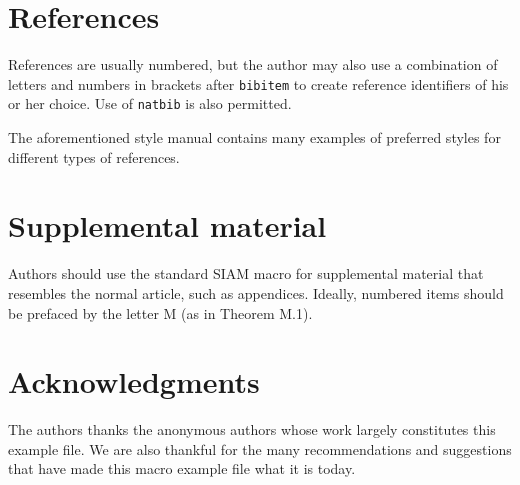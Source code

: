 \documentclass[final,leqno,onetabnum]{siamltex0315}
\begin{document}
\section{References}
References are usually numbered, but the author may also use a combination of letters and numbers in 
brackets after {\tt bibitem} to create reference identifiers of his or her choice.  Use of \texttt{natbib} is also permitted.

The aforementioned style manual contains many examples of preferred styles for different types of references.

\section{Supplemental material}
Authors should use the standard SIAM macro for supplemental material that resembles the normal article, such as appendices.  Ideally, numbered items should be prefaced
by the letter M (as in Theorem M.1).

\section*{Acknowledgments}
The authors thanks the anonymous authors whose work largely constitutes this example file. We are also thankful for the many
recommendations and suggestions that have made this macro example file what it is today.
 
\end{document}

